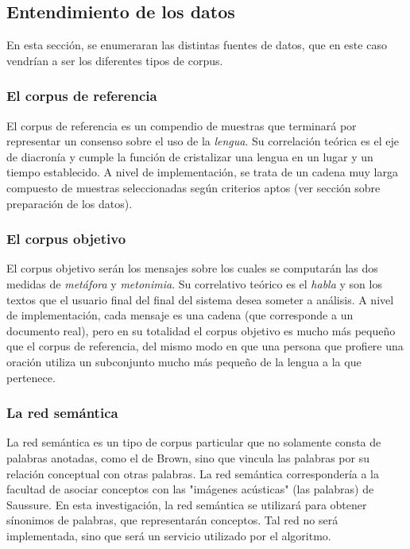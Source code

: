 \documentclass[12pt,letterpaper,twoside]{article}
\begin{document}
\subsection{Entendimiento de los datos}
\label{sec:orgd795d61}

En esta sección, se enumeraran las distintas fuentes de datos,
que en este caso vendrían a ser los diferentes tipos de corpus.


\subsubsection{El corpus de referencia}
\label{sec:org8df3b31}

El corpus de referencia es un compendio de muestras
que terminará por representar un consenso sobre
el uso de la \emph{lengua}. Su correlación teórica
es el eje de diacronía y cumple la función de
cristalizar una lengua en un lugar y un tiempo establecido.
A nivel de implementación, se trata de un cadena muy larga
compuesto de muestras seleccionadas según criterios aptos
(ver sección sobre preparación de los datos).




\subsubsection{El corpus objetivo}
\label{sec:orgcfe4198}

El corpus objetivo serán los mensajes sobre los cuales se
computarán las dos medidas de \emph{metáfora} y \emph{metonimia}.
Su correlativo teórico es el \emph{habla} y son los
textos que el usuario final del final del sistema desea
someter a análisis. A nivel de implementación, cada mensaje
es una cadena (que corresponde a un documento real), pero
en su totalidad el corpus objetivo es mucho más pequeño
que el corpus de referencia, del mismo modo en que una
persona que profiere una oración utiliza un subconjunto
mucho más pequeño de la lengua a la que pertenece.  

\subsubsection{La red semántica}
\label{sec:orga3531ca}

La red semántica es un tipo de corpus particular que no solamente
consta de palabras anotadas, como el de Brown, sino que vincula
las palabras por su relación conceptual con otras palabras. La
red semántica correspondería a la facultad de asociar conceptos
con las "imágenes acústicas" (las palabras) de Saussure. En esta
investigación, la red semántica se utilizará para obtener
sínonimos de palabras, que representarán conceptos. Tal red
no será implementada, sino que será un servicio utilizado por
el algoritmo. 
\end{document}
